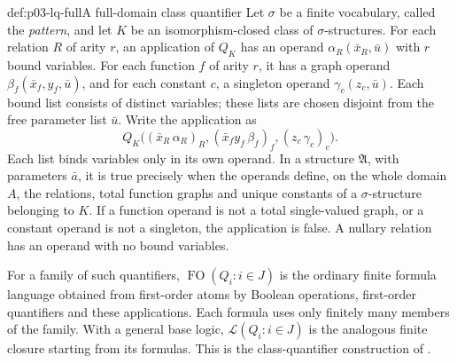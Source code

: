 \begin{hbdefinition}{def:p03-lq-full}{A full-domain class quantifier}
Let \(\sigma\) be a finite vocabulary, called the \emph{pattern}, and
let \(K\) be an isomorphism-closed class of \(\sigma\)-structures.
For each relation \(R\) of arity \(r\), an application of \(Q_K\)
has an operand \(\alpha_R(\bar x_R,\bar u)\) with \(r\) bound
variables. For each function \(f\) of arity \(r\), it has a graph
operand \(\beta_f(\bar x_f,y_f,\bar u)\), and for each constant
\(c\), a singleton operand \(\gamma_c(z_c,\bar u)\).
Each bound list consists of distinct variables; these lists are
chosen disjoint from the free parameter list \(\bar u\).
Write the application as
\[
 Q_K\bigl((\bar x_R\,\alpha_R)_R,
          (\bar x_f y_f\,\beta_f)_f,(z_c\,\gamma_c)_c\bigr).
\]
Each list binds variables only in its own operand.
In a structure \(\mathfrak A\), with parameters \(\bar a\), it is
true precisely when the operands define, on the whole domain \(A\),
the relations, total function graphs and unique constants of a
\(\sigma\)-structure belonging to \(K\).
If a function operand is not a total single-valued graph, or a
constant operand is not a singleton, the application is false.
A nullary relation has an operand with no bound variables.

For a family of such quantifiers, \(\operatorname{FO}(Q_i:i\in J)\)
is the ordinary finite formula language obtained from first-order
atoms by Boolean operations, first-order quantifiers and these
applications. Each formula uses only finitely many members of the
family. With a general base logic, \(\mathscr L(Q_i:i\in J)\)
is the analogous finite closure starting from its formulas.
This is the class-quantifier construction of
\cite[Ch.~II, Definition~4.1.1, pp.~49--50]{Ebbinghaus1985ExtendedLogics}.
\end{hbdefinition}

